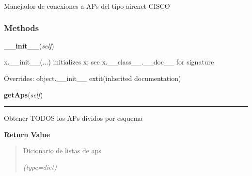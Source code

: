 Manejador de conexiones a APs del tipo airenet CISCO



  \subsubsection{Methods}

    \vspace{0.5ex}

\hspace{.8\funcindent}\begin{boxedminipage}{\funcwidth}

    \raggedright \textbf{\_\_init\_\_}(\textit{self})

\setlength{\parskip}{2ex}
    x.\_\_init\_\_(...) initializes x; see x.\_\_class\_\_.\_\_doc\_\_ for 
    signature

\setlength{\parskip}{1ex}
      Overrides: object.\_\_init\_\_ 	extit{(inherited documentation)}

    \end{boxedminipage}

    \label{web2py:applications:macfilter:modules:sshToApsManager:sshToApsManager:getAps}

    \vspace{0.5ex}

\hspace{.8\funcindent}\begin{boxedminipage}{\funcwidth}

    \raggedright \textbf{getAps}(\textit{self})

    \vspace{-1.5ex}

    \rule{\textwidth}{0.5\fboxrule}
\setlength{\parskip}{2ex}
    Obtener TODOS los APs dividos por esquema

\setlength{\parskip}{1ex}
      \textbf{Return Value}
    \vspace{-1ex}

      \begin{quote}
      Dicionario de listas de aps

      {\it (type=dict)}

      \end{quote}

    \end{boxedminipage}

